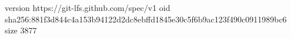version https://git-lfs.github.com/spec/v1
oid sha256:881f3d844c4a153b94122d2dc8ebffd1845e30c5f6b9ac123f490c0911989bc6
size 3877
